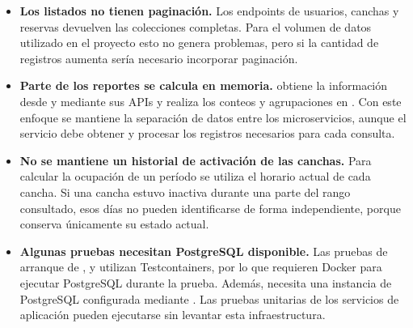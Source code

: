 \begin{itemize}

    \item \textbf{Los listados no tienen paginación.}
    Los endpoints de usuarios, canchas y reservas devuelven las colecciones
    completas. Para el volumen de datos utilizado en el proyecto esto no genera
    problemas, pero si la cantidad de registros aumenta sería necesario
    incorporar paginación.

    \item \textbf{Parte de los reportes se calcula en memoria.}
     obtiene la información desde  y
     mediante sus APIs y realiza los conteos y agrupaciones en
    . Con este enfoque se mantiene la separación de datos
    entre los microservicios, aunque el servicio debe obtener y procesar los
    registros necesarios para cada consulta.

    \item \textbf{No se mantiene un historial de activación de las canchas.}
    Para calcular la ocupación de un período se utiliza el horario actual de
    cada cancha. Si una cancha estuvo inactiva durante una parte del rango
    consultado, esos días no pueden identificarse de forma independiente,
    porque  conserva únicamente su estado actual.

    \item \textbf{Algunas pruebas necesitan PostgreSQL disponible.}
    Las pruebas de arranque de ,  y
     utilizan Testcontainers, por lo que requieren Docker para
    ejecutar PostgreSQL durante la prueba. Además, 
    necesita una instancia de PostgreSQL configurada mediante
    . Las pruebas unitarias de los servicios de
    aplicación pueden ejecutarse sin levantar esta infraestructura.

\end{itemize}
